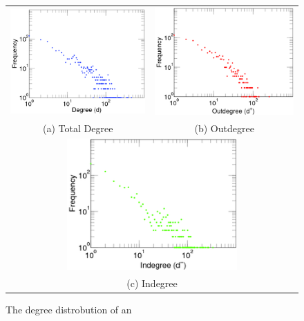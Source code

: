 \begin{figure}
	\begin{tabular}{cc}
		\includegraphics[width=65mm]{images/blogs_total.png} &   \includegraphics[width=65mm]{images/blogs_out.png} \\
		(a) Total Degree & (b) Outdegree \\[6pt]
		\multicolumn{2}{c}{\includegraphics[width=65mm]{images/blogs_in.png} }\\
		\multicolumn{2}{c}{(c) Indegree}
	\end{tabular}
	\caption{The degree distrobution of an \do}
	\label{power}
\end{figure}



